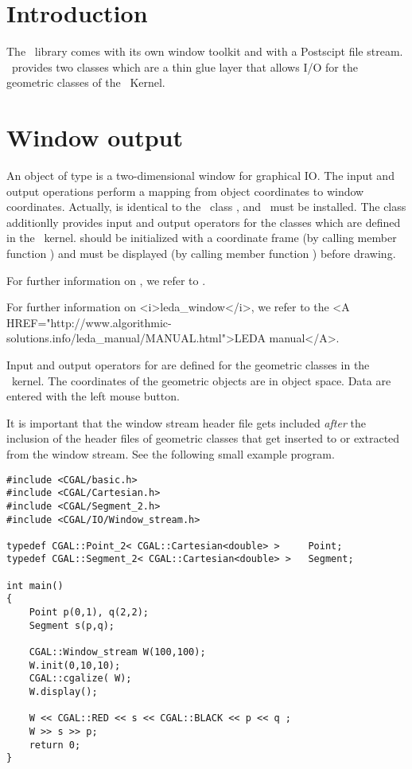 \ccParDims

\section{Introduction}

The \leda\ library comes with its own window toolkit and with a
Postscipt file stream. \cgal\ provides two classes 
   
which  are a thin glue layer that allows I/O for the geometric 
classes of the \cgal\ Kernel.


\section{Window output}

An object of type  is a two-dimensional window for
graphical IO. The input and output operations perform a mapping from
object coordinates to window coordinates.
Actually,  is identical to the \leda\ class ,
and \leda\ must be installed. The class additionlly provides input and output 
operators for the classes which are defined in the \cgal\ kernel.
 should be initialized with a coordinate frame 
(by calling member function
) and must be displayed (by calling member function ) before
drawing.

\begin{ccTexOnly}
For further information on , we refer to \cite{mnsu-lum}.
\end{ccTexOnly}
\begin{ccHtmlOnly}
For further information on <i>leda_window</i>, we refer to the 
<A HREF="http://www.algorithmic-solutions.info/leda_manual/MANUAL.html">LEDA manual</A>.
\end{ccHtmlOnly}

Input and output operators for  are defined for 
the geometric classes in the \cgal\ kernel.
The coordinates of the geometric objects are in object space. Data are
entered with the left mouse button.

It is important that the window stream header file gets included
{\em after} the inclusion of the header files of geometric classes
that get inserted to or extracted from the window stream. See the following 
small example program.

\begin{verbatim}
#include <CGAL/basic.h>
#include <CGAL/Cartesian.h>
#include <CGAL/Segment_2.h>
#include <CGAL/IO/Window_stream.h>

typedef CGAL::Point_2< CGAL::Cartesian<double> >     Point;
typedef CGAL::Segment_2< CGAL::Cartesian<double> >   Segment;

int main()
{
    Point p(0,1), q(2,2);
    Segment s(p,q);

    CGAL::Window_stream W(100,100);
    W.init(0,10,10);
    CGAL::cgalize( W);
    W.display();

    W << CGAL::RED << s << CGAL::BLACK << p << q ;
    W >> s >> p;
    return 0;
}
\end{verbatim} 

